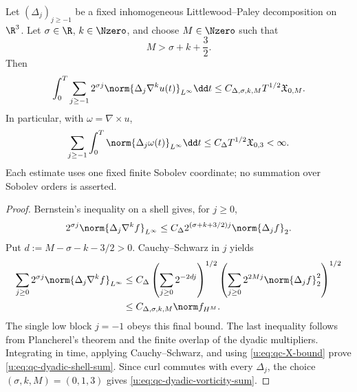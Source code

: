 \begin{proposition}
\label{u:prop:qc-dyadic-shell-sums}
Let \((\Delta_j)_{j\ge-1}\) be a fixed inhomogeneous
Littlewood--Paley decomposition on \(\R^3\).  Let
\(\sigma\in\R\), \(k\in\Nzero\), and choose \(M\in\Nzero\) such that
\begin{equation}
 M>\sigma+k+\frac32.
 \label{u:eq:qc-dyadic-order-condition}
\end{equation}
Then
\begin{equation}
 \int_0^T\sum_{j\ge-1}2^{\sigma j}
 \norm{\Delta_j\nabla^ku(t)}_{L^\infty}\dd t
 \le C_{\Delta,\sigma,k,M}T^{1/2}\mathfrak X_{0,M}.
 \label{u:eq:qc-dyadic-shell-sum}
\end{equation}
In particular, with \(\omega=\nabla\times u\),
\begin{equation}
 \sum_{j\ge-1}\int_0^T
 \norm{\Delta_j\omega(t)}_{L^\infty}\dd t
 \le C_\Delta T^{1/2}\mathfrak X_{0,3}<\infty.
 \label{u:eq:qc-dyadic-vorticity-sum}
\end{equation}
Each estimate uses one fixed finite Sobolev coordinate; no summation over
Sobolev orders is asserted.
\end{proposition}

\begin{proof}
Bernstein's inequality on a shell gives, for \(j\ge0\),
\[
 2^{\sigma j}\norm{\Delta_j\nabla^kf}_{L^\infty}
 \le C_\Delta 2^{(\sigma+k+3/2)j}\norm{\Delta_jf}_2.
\]
Put \(d:=M-\sigma-k-3/2>0\).  Cauchy--Schwarz in \(j\) yields
\begin{align*}
 \sum_{j\ge0}2^{\sigma j}
 \norm{\Delta_j\nabla^kf}_{L^\infty}
 &\le C_\Delta
 \left(\sum_{j\ge0}2^{-2dj}\right)^{1/2}
 \left(\sum_{j\ge0}2^{2Mj}\norm{\Delta_jf}_2^2\right)^{1/2}\\
 &\le C_{\Delta,\sigma,k,M}\norm f_{H^M}.
\end{align*}
The single low block \(j=-1\) obeys this final bound.  The last
inequality follows from Plancherel's theorem and the finite overlap of the
dyadic multipliers.  Integrating in time, applying Cauchy--Schwarz, and using
\eqref{u:eq:qc-X-bound} prove \eqref{u:eq:qc-dyadic-shell-sum}.  Since curl
commutes with every \(\Delta_j\), the choice
\((\sigma,k,M)=(0,1,3)\) gives
\eqref{u:eq:qc-dyadic-vorticity-sum}.
\end{proof}

